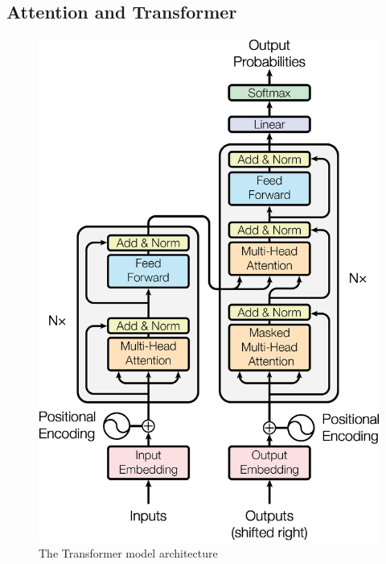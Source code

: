 \citet{chung2014empirical}

\subsection{Attention and Transformer}
\citet{bahdanau2016neural}

\begin{minipage}[ht]{.6\textwidth}
    \begin{figure}[H]
        \centering
        \includegraphics[width=\textwidth]{literature/imgs/ext-transformer.png}
        \caption{The Transformer model architecture \cite{vaswani2017attention}}
        \label{fig:ext-transformer}
    \end{figure}
\end{minipage}

